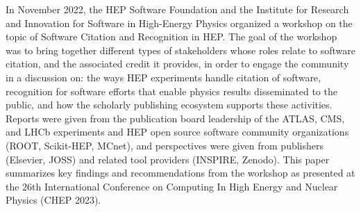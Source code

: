 In November 2022, the HEP Software Foundation and the Institute for Research and Innovation for Software in High-Energy Physics organized a workshop on the topic of Software Citation and Recognition in HEP.
The goal of the workshop was to bring together different types of stakeholders whose roles relate to software citation, and the associated credit it provides, in order to engage the community in a discussion on: the ways HEP experiments handle citation of software, recognition for software efforts that enable physics results disseminated to the public, and how the scholarly publishing ecosystem supports these activities.
Reports were given from the publication board leadership of the ATLAS, CMS, and LHCb experiments and HEP open source software community organizations (ROOT, Scikit-HEP, MCnet), and perspectives were given from publishers (Elsevier, JOSS) and related tool providers (INSPIRE, Zenodo).
This paper summarizes key findings and recommendations from the workshop as presented at the 26th International Conference on Computing In High Energy and Nuclear Physics (CHEP 2023).

